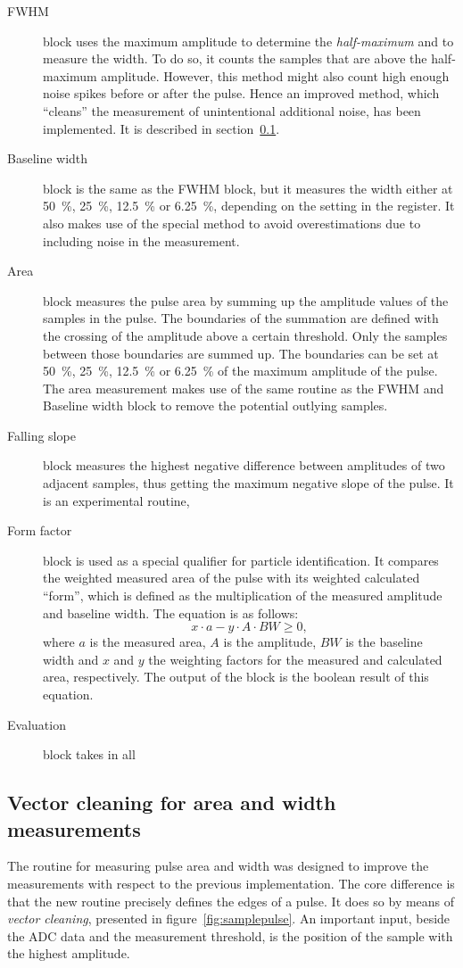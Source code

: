 \documentclass[12pt]{packages/mytustyle}  %
\begin{document}
\begin{description}
\item[FWHM] block uses the maximum amplitude to determine the \emph{half-maximum} and to measure the width. To do so, it counts the samples that are above the half-maximum amplitude. However, this method might also count high enough noise spikes before or after the pulse. Hence an improved method, which ``cleans'' the measurement of unintentional additional noise, has been implemented. It is described in section~\ref{sec:vecclean}.
\item[Baseline width] block is the same as the FWHM block, but it measures the width either at 50~\%, 25~\%, 12.5~\% or 6.25~\%, depending on the setting in the register. It also makes use of the special method to avoid overestimations due to including noise in the measurement.
\item[Area] block measures the pulse area by summing up the amplitude values of the samples in the pulse. The boundaries of the summation are defined with the crossing of the amplitude above a certain threshold. Only the samples between those boundaries are summed up. The boundaries can be set at  50~\%, 25~\%, 12.5~\% or 6.25~\% of the maximum amplitude of the pulse. The area measurement makes use of the same routine as the FWHM and Baseline width block to remove the potential outlying samples.

\item[Falling slope] block measures the highest negative difference between amplitudes of two adjacent samples, thus getting the maximum negative slope of the pulse. It is an experimental routine,
\item[Form factor] block is used as a special qualifier for particle identification. It compares the weighted measured area of the pulse with its weighted calculated ``form'', which is defined as the multiplication of the measured amplitude and baseline width. The equation is as follows:
\begin{equation}
\label{eq:formfactor1}
x\cdot a - y \cdot A \cdot BW \geq 0,
\end{equation}
where $a$ is the measured area, $A$ is the amplitude, $BW$ is the baseline width and $x$ and $y$ the weighting factors for the measured and calculated area, respectively. The output of the block is the boolean result of this equation.
\item[Evaluation] block takes in all 

\end{description}


\subsection{Vector cleaning for area and width measurements}
\label{sec:vecclean}
The routine for measuring pulse area and width was designed to improve the measurements with respect to the previous implementation. The core difference is that the new routine precisely defines the edges of a pulse. It does so by means of \emph{vector cleaning}, presented in figure~\ref{fig:samplepulse}. An important input, beside the ADC data and the measurement threshold, is the position of the sample with the highest amplitude. 
\end{document}
